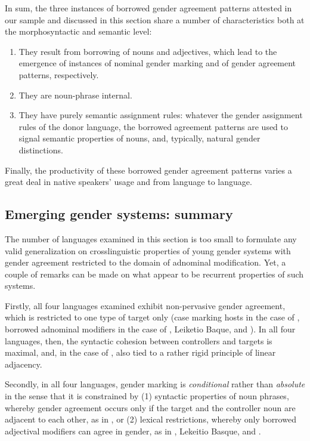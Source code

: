 \documentclass[output=collectionpaper]{langsci/langscibook}
\begin{document}
In sum,  the three instances of borrowed gender agreement patterns attested in our sample and discussed in this section share a number of characteristics both at the morphosyntactic and semantic level:
\begin{enumerate}
\item They result from borrowing of nouns and adjectives, which lead to the emergence of instances of nominal gender marking and of gender agreement patterns, respectively.
\item They are noun-phrase internal.
\item They have purely semantic assignment rules: whatever the gender assignment rules of the donor language, the borrowed agreement patterns are used to signal semantic properties of nouns, and, typically, natural gender distinctions.
\end{enumerate}

Finally, the productivity of these borrowed gender agreement patterns varies a great deal in native speakers' usage and from language to language.

\subsection{Emerging gender systems: summary}
The number of languages examined in this section is too small to formulate any valid generalization on crosslinguistic properties of young gender systems with gender agreement restricted to the domain of adnominal modification. Yet, a couple of remarks can be made on what appear to be recurrent properties of such systems.

Firstly, all four languages examined exhibit non-pervasive gender agreement, which is restricted to one type of target only (case marking hosts in the case of , borrowed adnominal modifiers in the case of , Leiketio Baque, and ). In all four languages, then, the syntactic cohesion between controllers and targets is maximal, and, in the case of , also tied to a rather rigid principle of linear adjacency.

Secondly, in all four languages, gender marking is \textit{conditional} rather than \textit{absolute} in the sense that it is constrained by (1) syntactic properties of noun phrases, whereby gender agreement occurs only if the target and the controller noun are adjacent to each other, as in , or (2) lexical restrictions, whereby only borrowed adjectival modifiers can agree in gender, as in , Lekeitio Basque, and .
\end{document}
